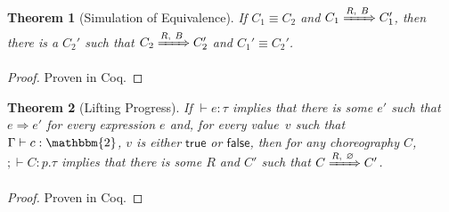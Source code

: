 \documentclass{article}
\newtheorem{thm}{Theorem}
\theoremstyle{definition}
\newcommand{\bool}{\mathbbm{2}}
\newcommand{\ett}{\textsf{true}}
\newcommand{\eff}{\textsf{false}}
\newcommand{\To}{\Rightarrow}
\newcommand{\subst}[3]{#1~[#2 \mapsto #3]}
\newcommand{\ceq}{\equiv}
\newcommand{\own}[2]{#1.#2}
\newcommand{\send}[3][]{#2\nolinebreak \mathrel{\xrightarrow{#1}}\nolinebreak #3}
\newcommand{\cif}[3]{\textsf{if}~#1 \mathrel{\textsf{then}}\nolinebreak #2 \mathrel{\textsf{else}}\nolinebreak #3}
\newcommand{\clet}[2]{\textsf{let}~#1\nolinebreak =\nolinebreak #2 \mathrel{\textsf{in}}}
\newcommand{\proves}{\vdash}
\begin{document}
\noindent{}


\begin{thm}[Simulation of Equivalence]
  \label{thm:simulation-equiv}
  If $C_1 \ceq C_2$ and $C_1 \xRightarrow{R,~B} C_1'$, then there is a $C_2'$ such that $C_2 \xRightarrow{R,~B} C_2'$ and $C_1' \ceq C_2'$.
\end{thm}
\begin{proof}
  Proven in Coq.
\end{proof}

\begin{thm}[Lifting Progress]
  \label{thm:lifting-progress}
  If $\proves e : \tau$ implies that there is some $e'$ such that $e \To e'$ for every expression $e$ and, for every value~$v$ such that $\Gamma \proves c : \bool$, $v$ is either $\ett$ or $\eff$, then for any choreography $C$, $; \proves C : p.\tau$ implies that there is some $R$ and $C'$ such that $C \xRightarrow{R,~\varnothing} C'$.
\end{thm}
\begin{proof}
  Proven in Coq.
\end{proof}
\end{document}
